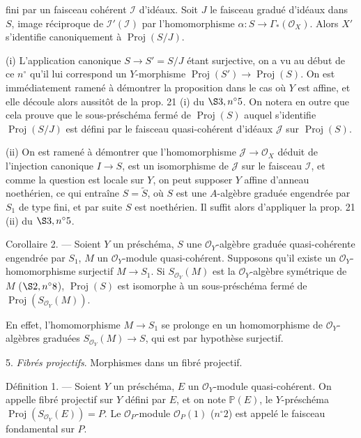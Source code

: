 fini par un faisceau cohérent $\mathcal{I}$ d'idéaux. Soit $J$ le faisceau gradué d'idéaux dans $S$, image réciproque de $\mathcal{I}'(\mathcal{I})$ par l'homomorphisme $\alpha : S \to \Gamma_*(\mathcal{O}_X)$. Alors $X'$ s'identifie canoniquement à $\operatorname{Proj}(S/J)$.

(i) L'application canonique $S \to S'=S/J$ étant surjective, on a vu au début de ce $n^\circ$ qu'il lui correspond un $Y$-morphisme $\operatorname{Proj}(S') \to \operatorname{Proj}(S)$. On est immédiatement ramené à démontrer la proposition dans le cas où $Y$ est affine, et elle découle alors aussitôt de la prop. 21 (i) du $\S 3, n^\circ 5$. On notera en outre que cela prouve que le sous-préschéma fermé de $\operatorname{Proj}(S)$ auquel s'identifie $\operatorname{Proj}(S/J)$ est défini par le faisceau quasi-cohérent d'idéaux $\mathcal{J}$ sur $\operatorname{Proj}(S)$.

(ii) On est ramené à démontrer que l'homomorphisme $\mathcal{J} \to \mathcal{O}_X$ déduit de l'injection canonique $I \to S$, est un isomorphisme de $\mathcal{J}$ sur le faisceau $\mathcal{I}$, et comme la question est locale sur $Y$, on peut supposer $Y$ affine d'anneau noethérien, ce qui entraîne $S = \tilde{S}$, où $S$ est une $A$-algèbre graduée engendrée par $S_1$ de type fini, et par suite $S$ est noethérien. Il suffit alors d'appliquer la prop. 21 (ii) du $\S 3, n^\circ 5$.

Corollaire 2. — Soient $Y$ un préschéma, $S$ une $\mathcal{O}_Y$-algèbre graduée quasi-cohérente engendrée par $S_1$, $M$ un $\mathcal{O}_Y$-module quasi-cohérent. Supposons qu'il existe un $\mathcal{O}_Y$-homomorphisme surjectif $M \to S_1$. Si $S_{\mathcal{O}_Y}(M)$ est la $\mathcal{O}_Y$-algèbre symétrique de $M$ ($\S 2, n^\circ 8$), $\operatorname{Proj}(S)$ est isomorphe à un sous-préschéma fermé de $\operatorname{Proj}(S_{\mathcal{O}_Y}(M))$.

En effet, l'homomorphisme $M \to S_1$ se prolonge en un homomorphisme de $\mathcal{O}_Y$-algèbres graduées $S_{\mathcal{O}_Y}(M) \to S$, qui est par hypothèse surjectif.

5. \emph{Fibrés projectifs}. Morphismes dans un fibré projectif.

Définition 1. — Soient $Y$ un préschéma, $E$ un $\mathcal{O}_Y$-module quasi-cohérent. On appelle fibré projectif sur $Y$ défini par $E$, et on note $\mathbb{P}(E)$, le $Y$-préschéma $\operatorname{Proj}(S_{\mathcal{O}_Y}(E)) = P$. Le $\mathcal{O}_P$-module $\mathcal{O}_P(1)$ ($n^\circ 2$) est appelé le faisceau fondamental sur $P$.

